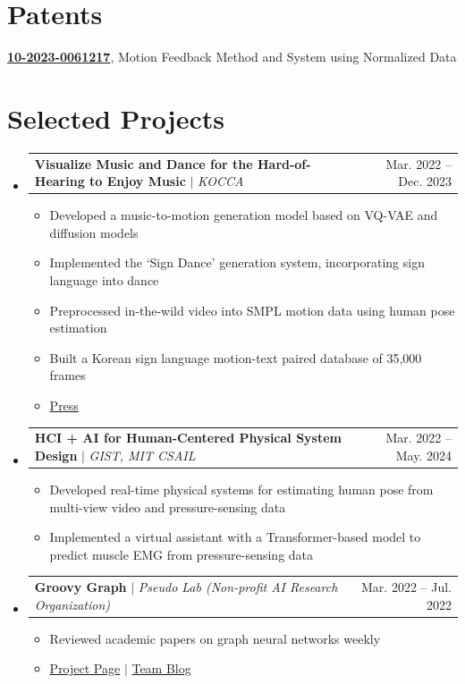 \documentclass[letterpaper,11pt]{article}
\makeatletter
\newcommand{\resumeItem}[1]{
  \item\small{
    {#1 \vspace{-2pt}}
  }
}
\newcommand{\resumeProjectHeading}[2]{
    \item
    \begin{tabular*}{0.97\textwidth}{l@{\extracolsep{\fill}}r}
      \small#1 & #2 \\
    \end{tabular*}\vspace{-7pt}
}
\newcommand{\resumeSubHeadingListStart}{\begin{itemize}[leftmargin=0.15in, label={}]}
\newcommand{\resumeSubHeadingListEnd}{\end{itemize}}
\newcommand{\resumeItemListStart}{\begin{itemize}}
\newcommand{\resumeItemListEnd}{\end{itemize}\vspace{-5pt}}
\makeatother
\begin{document}
%
\section{Patents}
 \begin{itemize}[leftmargin=0.15in, label={}]
    \small{\item{
     \textbf{\href{https://doi.org/10.8080/1020230061217}{10-2023-0061217}}{, Motion Feedback Method and System using Normalized Data} \\
    }}
 \end{itemize}

\section{Selected Projects}
    \resumeSubHeadingListStart
    \resumeProjectHeading
        {\textbf{Visualize Music and Dance for the Hard-of-Hearing to Enjoy Music} $|$ \emph{KOCCA}}{Mar. 2022 -- Dec. 2023}
          \resumeItemListStart
            \resumeItem{Developed a music-to-motion generation model based on VQ-VAE and diffusion models}
            \resumeItem{Implemented the `Sign Dance' generation system, incorporating sign language into dance}
            \resumeItem{Preprocessed in-the-wild video into SMPL motion data using human pose estimation}
            \resumeItem{Built a Korean sign language motion-text paired database of 35,000 frames}
            \resumeItem{\href{https://n.news.naver.com/mnews/article/056/0011492822?sid=103}{Press}}
          \resumeItemListEnd
    \resumeProjectHeading
          {\textbf{HCI + AI for Human-Centered Physical System Design} $|$ \emph{GIST, MIT CSAIL}}{Mar. 2022 -- May. 2024}
          \resumeItemListStart
            \resumeItem{Developed real-time physical systems for estimating human pose from multi-view video and pressure-sensing data}
            \resumeItem{Implemented a virtual assistant with a Transformer-based model to predict muscle EMG from pressure-sensing data}
          \resumeItemListEnd
      \resumeProjectHeading
          {\textbf{Groovy Graph} $|$ \emph{Pseudo Lab (Non-profit AI Research Organization)}}{Mar. 2022 -- Jul. 2022}
          \resumeItemListStart
            \resumeItem{Reviewed academic papers on graph neural networks weekly}
            \resumeItem{\href{https://chanrankim.notion.site/Groovy-Graph-1a98bd335501499e894efd5a79efe479}{Project Page} $|$ \href{https://pseudo-lab.github.io/graph/}{Team Blog}}
          \resumeItemListEnd
    \resumeSubHeadingListEnd
\end{document}
